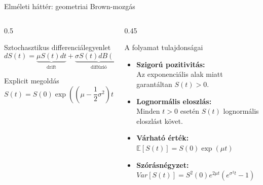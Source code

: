 \documentclass[aspectratio=169,11pt]{beamer}
\begin{document}
\begin{frame}{Elméleti háttér: geometriai Brown-mozgás}

    \begin{columns}[c,onlytextwidth]

        \begin{column}{0.5\textwidth}

            \begin{block}{Sztochasztikus differenciálegyenlet}
                \vspace{-0.2cm}
                \[ dS(t) = \underbrace{\mu S(t)dt}_{\text{drift}} + \underbrace{\sigma S(t)dB(t)}_{\text{diffúzió}} \]
            \end{block}

            \vspace{0.1cm}

            \begin{block}{Explicit megoldás}
                \vspace{-0.4cm}
                \[ S(t) = S(0) \exp\left( \left( \mu - \frac{1}{2}\sigma^2 \right)t + \sigma B(t) \right) \]
            \end{block}

        \end{column}

        \begin{column}{0.45\textwidth}

            \begin{block}{A folyamat tulajdonságai}
                \small
                \begin{itemize}
                    \item \textbf{Szigorú pozitivitás:}\\ Az exponenciális alak miatt garantáltan $S(t) > 0$.
                    \vspace{0.2cm}
                    \item \textbf{Lognormális eloszlás:}\\ Minden $t > 0$ esetén $S(t)$ lognormális eloszlást követ.
                    \vspace{0.2cm}

                    \item \textbf{Várható érték:}\\ $\mathbb{E}[S(t)] = S(0)\exp(\mu t)$
                    \vspace{0.2cm}
                    \item \textbf{Szórásnégyzet:}\\ $Var[S(t)] = S^2(0)e^{2\mu t}(e^{\sigma^2 t} - 1)$
                \end{itemize}
            \end{block}

        \end{column}

    \end{columns}

\end{frame}
\end{document}
